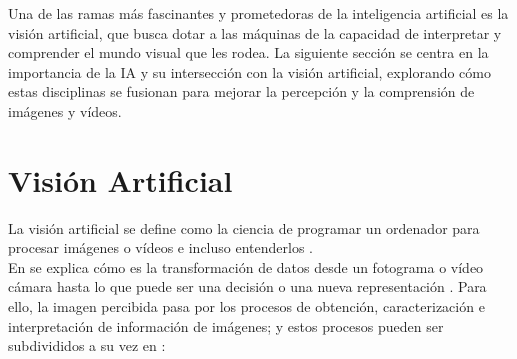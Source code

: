 


Una de las ramas más fascinantes y prometedoras de la inteligencia artificial es la visión artificial, que busca dotar a las máquinas de la capacidad de interpretar y comprender el mundo visual que les rodea. La siguiente sección se centra en la importancia de la IA y su intersección con la visión artificial, explorando cómo estas disciplinas se fusionan para mejorar la percepción y la comprensión de imágenes y vídeos.

\section{Visión Artificial}
\label{sec:VA} 

La visión artificial se define como la ciencia de programar un ordenador para procesar imágenes o vídeos e incluso entenderlos \cite{Culjak12}.\\

En \cite{Bradski08} se explica cómo es la transformación de datos desde un fotograma o vídeo cámara hasta lo que puede ser una decisión o una nueva representación \cite{Alvear17}. Para ello, la imagen percibida pasa por los procesos de obtención, caracterización e interpretación de información de imágenes; y estos procesos pueden ser subdivididos a su vez en \cite{Santillan15}: %

